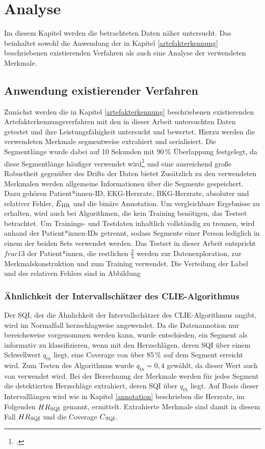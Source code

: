 \chapter{Analyse}\label{analyse}

Im diesem Kapitel werden die betrachteten Daten näher untersucht. Das beinhaltet sowohl die Anwendung der in Kapitel \ref{artefakterkennung} beschriebenen existierenden Verfahren als auch eine Analyse der verwendeten Merkmale.


\section{Anwendung existierender Verfahren}

Zunächst werden die in Kapitel \ref{artefakterkennung} beschriebenen existierenden Artefakterkennungsverfahren mit den in dieser Arbeit untersuchten Daten getestet und  ihre Leistungsfähigkeit untersucht und bewertet. Hierzu werden die verwendeten Merkmale segmentweise extrahiert und serialisiert. Die Segmentlänge wurde dabei auf 10 Sekunden mit 90\,\% Überlappung festgelegt, da diese Segmentlänge häufiger verwendet wird\footcite[Vgl.][]{Yu2020, Sadek2016} und eine ausreichend große Robustheit gegenüber des Drifts der Daten bietet Zusätzlich zu den verwendeten Merkmalen werden allgemeine Informationen über die Segmente gespeichert. Dazu gehören Patient*innen-ID, EKG-Herzrate, BKG-Herzrate, absoluter und relativer Fehler, $E\textsubscript{HR}$ und die binäre Annotation. Um vergleichbare Ergebnisse zu erhalten, wird auch bei Algorithmen, die kein Training benötigen, das Testset betrachtet. Um Trainings- und Testdaten inhaltlich vollständig zu trennen, wird anhand der Patient*innen-IDs getrennt, sodass Segmente einer Person lediglich in einem der beiden Sets verwendet werden. Das Testset in dieser Arbeit entspricht $frac{1}{3}$ der Patient*innen, die restlichen $\frac{2}{3}$ werden zur Datenexploration, zur Merkmalskonstruktion und zum Training verwendet. Die Verteilung der Label und des relativen Fehlers sind in Abbildung %

\subsection{Ähnlichkeit der Intervallschätzer des CLIE-Algorithmus}

Der \ac{SQI}, der die Ähnlichkeit der Intervallschätzer des \ac{CLIE}-Algorithmus angibt, wird im Normalfall herzschlagweise angewendet. Da die Datenannotion nur bereichsweise vorgenommen werden kann, wurde entschieden, ein Segment als informativ zu klassifizieren, wenn mit den Herzschlägen, deren \ac{SQI} über einem Schwellwert $q_{th}$ liegt, eine Coverage von über 85\,\% auf dem Segment erreicht wird. Zum Testen des Algorithmus wurde $q_{th} = 0{,}4$ gewählt, da dieser Wert auch von \citeauthor{Zink2017} verwendet wird. Bei der Berechnung der Merkmale werden für jedes Segment die detektierten Herzschläge extrahiert, deren \ac{SQI} über $q_{th}$ liegt. Auf Basis dieser Intervalllängen wird wie in Kapitel \ref{annotation} beschrieben die Herzrate, im Folgenden $HR\textsubscript{SQI}$ genannt, ermittelt. Extrahierte Merkmale sind damit in diesem Fall $HR\textsubscript{SQI}$ und die Coverage $C\textsubscript{SQI}$.

